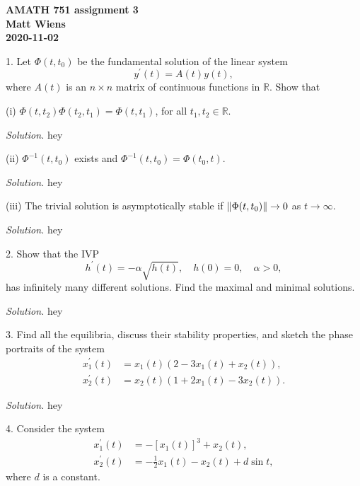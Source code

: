 \documentclass{article}
\newcommand{\R}{\mathbb{R}}
\begin{document}
\textbf{AMATH 751 assignment 3} \\
\textbf{Matt Wiens} \\
\textbf{2020-11-02}

1. Let $\Phi(t, t_0)$ be the fundamental solution of the linear system
%
\begin{equation*}
    y^\prime(t) = A(t) y(t),
\end{equation*}
%
where $A(t)$ is an $n \times n$ matrix of continuous functions in $\R$. Show that

(i) $\Phi(t, t_2) \Phi(t_2, t_1) = \Phi(t, t_1)$, for all $t_1, t_2 \in \R$.

\textit{Solution.}
hey

\vspace{5mm}

(ii) $\Phi^{-1}(t, t_0)$ exists and $\Phi^{-1}(t, t_0) = \Phi(t_0, t)$.

\textit{Solution.}
hey

\vspace{5mm}

(iii) The trivial solution is asymptotically stable if
$\enVert[0]{\Phi(t, t_0)} \to 0$ as $t \to \infty$.

\textit{Solution.}
hey

\newpage

2. Show that the IVP
%
\begin{equation*}
    h^\prime(t) = - \alpha \sqrt{h(t)}, \quad h(0) = 0, \quad \alpha > 0,
\end{equation*}
%
has infinitely many different solutions. Find the maximal and minimal solutions.

\textit{Solution.}
hey

\newpage

3. Find all the equilibria, discuss their stability properties, and sketch the phase
portraits of the system
%
\begin{align*}
    x_1^\prime(t) &= x_1(t) (2 - 3 x_1(t) + x_2(t)), \\
    x_2^\prime(t) &= x_2(t) (1 + 2 x_1(t) - 3 x_2(t)).
\end{align*}

\textit{Solution.}
hey

\newpage

4. Consider the system
%
\begin{align*}
    x_1^\prime(t) &= - [x_1(t)]^3 + x_2(t), \\
    x_2^\prime(t) &= -\frac{1}{2} x_1(t) - x_2(t) + d \sin t,
\end{align*}
%
where $d$ is a constant.
\end{document}
